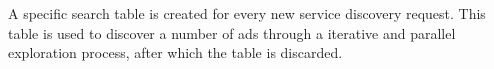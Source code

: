 A specific search table is created for every new service discovery request.
This table is used to discover a number of ads through a iterative and parallel exploration process, after which the table is discarded.





